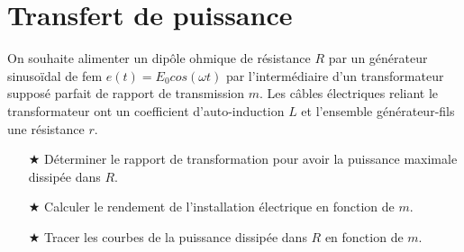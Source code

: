 \documentclass{report}
\begin{document}
\section*{Transfert de puissance}

On souhaite alimenter un dipôle ohmique de résistance $R$ par un générateur sinusoïdal de fem $e(t) = E_{0} cos(\omega t)$ par l'intermédiaire d'un transformateur supposé parfait de rapport de transmission $m$. Les câbles électriques reliant le transformateur ont un coefficient d'auto-induction $L$ et l'ensemble générateur-fils une résistance $r$.

\begin{itemize}
	\item[$\bigstar$] Déterminer le rapport de transformation pour avoir la puissance maximale dissipée dans $R$.
	\item[$\bigstar$] Calculer le rendement de l'installation électrique en fonction de $m$.
	\item[$\bigstar$] Tracer les courbes de la puissance dissipée dans $R$ en fonction de $m$.
\end{itemize}
\end{document}
